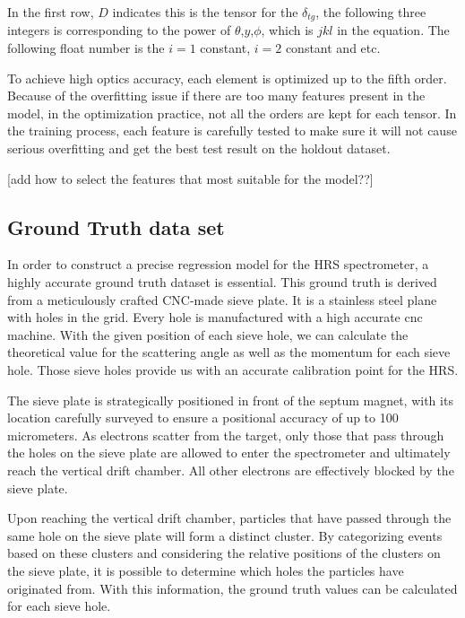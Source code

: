 In the first row, $D$ indicates this is the tensor for the $\delta_{tg}$, the following three integers is corresponding to the power of $\theta$,$y$,$\phi$, which is $jkl$ in the equation. The following float number is the $i=1$ constant, $i=2$ constant and etc. 


To achieve high optics accuracy, each element is optimized up to the fifth order. Because of the overfitting issue if there are too many features present in the model, in the optimization practice, not all the orders are kept for each tensor. In the training process, each feature is carefully tested to make sure it will not cause serious overfitting and get the best test result on the holdout dataset. 

[add how to select the features that most suitable for the model??]

\subsection{Ground Truth data set}

In order to construct a precise regression model for the HRS spectrometer, a highly accurate ground truth dataset is essential. This ground truth is derived from a meticulously crafted CNC-made sieve plate. It is a stainless steel plane with holes in the grid. Every hole is manufactured with a high accurate cnc machine. With the given position of each sieve hole, we can calculate the theoretical value for the scattering angle as well as the momentum for each sieve hole. Those sieve holes provide us with an accurate calibration point for the HRS. 

The sieve plate is strategically positioned in front of the septum magnet, with its location carefully surveyed to ensure a positional accuracy of up to 100 micrometers. As electrons scatter from the target, only those that pass through the holes on the sieve plate are allowed to enter the spectrometer and ultimately reach the vertical drift chamber. All other electrons are effectively blocked by the sieve plate.

Upon reaching the vertical drift chamber, particles that have passed through the same hole on the sieve plate will form a distinct cluster. By categorizing events based on these clusters and considering the relative positions of the clusters on the sieve plate, it is possible to determine which holes the particles have originated from. With this information, the ground truth values can be calculated for each sieve hole.

